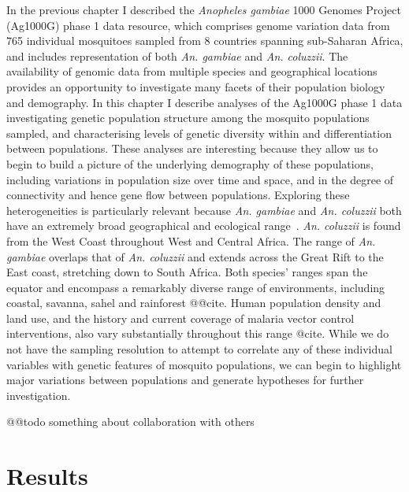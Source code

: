 \documentclass[a4paper,11pt,abstracton,hidelinks]{scrartcl}
\begin{document}
%
In the previous chapter I described the \textit{Anopheles gambiae} 1000 Genomes Project (Ag1000G) phase 1 data resource, which comprises genome variation data from 765 individual mosquitoes sampled from 8 countries spanning sub-Saharan Africa, and includes representation of both \textit{An. gambiae} and \textit{An. coluzzii}.
%
The availability of genomic data from multiple species and geographical locations provides an opportunity to investigate many facets of their population biology and demography.
%
In this chapter I describe analyses of the Ag1000G phase 1 data investigating genetic population structure among the mosquito populations sampled, and characterising levels of genetic diversity within and differentiation between populations.
%
These analyses are interesting because they allow us to begin to build a picture of the underlying demography of these populations, including variations in population size over time and space, and in the degree of connectivity and hence gene flow between populations.
%
Exploring these heterogeneities is particularly relevant because \textit{An. gambiae} and \textit{An. coluzzii} both have an extremely broad geographical and ecological range~\parencite{Wiebe2017}.
%
\textit{An. coluzzii} is found from the West Coast throughout West and Central Africa.
%
The range of \textit{An. gambiae} overlaps that of \textit{An. coluzzii} and extends across the Great Rift to the East coast, stretching down to South Africa.
%
Both species' ranges span the equator and encompass a remarkably diverse range of environments, including coastal, savanna, sahel and rainforest @@cite.
%
Human population density and land use, and the history and current coverage of malaria vector control interventions, also vary substantially throughout this range @cite.
%
While we do not have the sampling resolution to attempt to correlate any of these individual variables with genetic features of mosquito populations, we can begin to highlight major variations between populations and generate hypotheses for further investigation.
%


@@todo something about collaboration with others


\section{Results}\label{sec:results}
\end{document}
